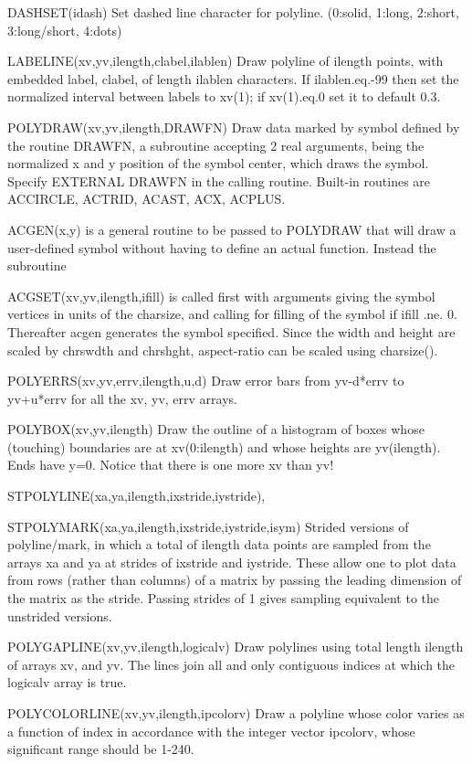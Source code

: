 \documentclass[12pt]{article}
\begin{document}
DASHSET(idash) Set dashed line character for polyline. 
(0:solid, 1:long, 2:short, 3:long/short, 4:dots)

LABELINE(xv,yv,ilength,clabel,ilablen) Draw polyline of ilength
points, with embedded label, clabel, of length ilablen characters. If
ilablen.eq.-99 then set the normalized interval between labels to
xv(1); if xv(1).eq.0 set it to default 0.3.

POLYDRAW(xv,yv,ilength,DRAWFN) Draw data marked by symbol defined by
the routine DRAWFN, a subroutine accepting 2 real arguments, being the
normalized x and y position of the symbol center, which draws the symbol.
Specify EXTERNAL DRAWFN in the calling routine. Built-in routines are
ACCIRCLE, ACTRID, ACAST, ACX, ACPLUS.

ACGEN(x,y) is a general routine to be passed to POLYDRAW that will draw a
user-defined symbol without having to define an actual
function. Instead the subroutine 

ACGSET(xv,yv,ilength,ifill) is called
first with arguments giving the symbol vertices in units of the
charsize, and calling for filling of the symbol if ifill .ne. 0.
Thereafter acgen generates the symbol specified. Since the width and
height are scaled by chrswdth and chrshght, aspect-ratio can be scaled
using charsize().

POLYERRS(xv,yv,errv,ilength,u,d) Draw error bars from yv-d*errv to
yv+u*errv for all the xv, yv, errv arrays.

POLYBOX(xv,yv,ilength) Draw the outline of a histogram of boxes whose
(touching) boundaries are at xv(0:ilength) and whose heights are
yv(ilength). Ends have y=0. Notice that there is one more xv than yv!

STPOLYLINE(xa,ya,ilength,ixstride,iystride),

STPOLYMARK(xa,ya,ilength,ixstride,iystride,isym) Strided versions of
polyline/mark, in which a total of ilength data points are sampled
from the arrays xa and ya at strides of ixstride and iystride. These
allow one to plot data from rows (rather than columns) of a matrix by
passing the leading dimension of the matrix as the stride. Passing
strides of 1 gives sampling equivalent to the unstrided versions.

POLYGAPLINE(xv,yv,ilength,logicalv) Draw polylines using total
length ilength of arrays xv, and yv. The lines join all and only
contiguous indices at which the logicalv array is true.

POLYCOLORLINE(xv,yv,ilength,ipcolorv) Draw a polyline whose color
varies as a function of index in accordance with the integer vector
ipcolorv, whose significant range should be 1-240.
\end{document}
